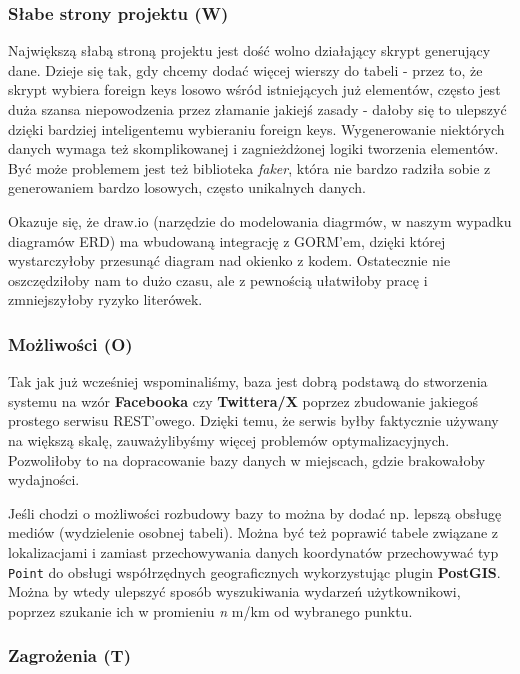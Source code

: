 \documentclass{article}
\begin{document}
\subsubsection{Słabe strony projektu (W)}

Największą słabą stroną projektu jest dość wolno działający skrypt generujący dane. Dzieje się tak, gdy chcemy dodać więcej wierszy do tabeli - przez to, że skrypt wybiera foreign keys losowo wśród istniejących już elementów, często jest duża szansa niepowodzenia przez złamanie jakiejś zasady - dałoby się to ulepszyć dzięki bardziej inteligentemu wybieraniu foreign keys. Wygenerowanie niektórych danych wymaga też skomplikowanej i zagnieżdżonej logiki tworzenia elementów. Być może problemem jest też biblioteka \textit{faker}, która nie bardzo radziła sobie z generowaniem bardzo losowych, często unikalnych danych.

Okazuje się, że draw.io (narzędzie do modelowania diagrmów, w naszym wypadku diagramów ERD) ma wbudowaną integrację z GORM'em, dzięki której wystarczyłoby przesunąć diagram nad okienko z kodem. Ostatecznie nie oszczędziłoby nam to dużo czasu, ale z pewnością ułatwiłoby pracę i zmniejszyłoby ryzyko literówek.

\subsubsection{Możliwości (O)}

Tak jak już wcześniej wspominaliśmy, baza jest dobrą podstawą do stworzenia systemu na wzór \textbf{Facebooka} czy \textbf{Twittera/X} poprzez zbudowanie jakiegoś prostego serwisu REST'owego. Dzięki temu, że serwis byłby faktycznie używany na większą skalę, zauważylibyśmy więcej problemów optymalizacyjnych. Pozwoliłoby to na dopracowanie bazy danych w miejscach, gdzie brakowałoby wydajności.

Jeśli chodzi o możliwości rozbudowy bazy to można by dodać np. lepszą obsługę mediów (wydzielenie osobnej tabeli). Można być też poprawić tabele związane z lokalizacjami i zamiast przechowywania danych koordynatów przechowywać typ \texttt{Point} do obsługi współrzędnych geograficznych wykorzystując plugin \textbf{PostGIS}. Można by wtedy ulepszyć sposób wyszukiwania wydarzeń użytkownikowi, poprzez szukanie ich w promieniu \textit{n} m/km od wybranego punktu.

\subsubsection{Zagrożenia (T)}
\end{document}
